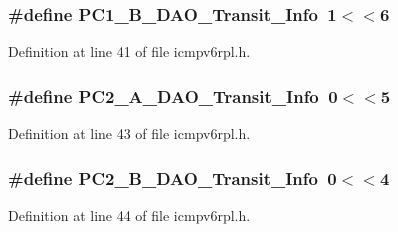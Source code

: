 \subsubsection[{\texorpdfstring{P\+C1\+\_\+\+B\+\_\+\+D\+A\+O\+\_\+\+Transit\+\_\+\+Info}{PC1_B_DAO_Transit_Info}}]{\setlength{\rightskip}{0pt plus 5cm}\#define P\+C1\+\_\+\+B\+\_\+\+D\+A\+O\+\_\+\+Transit\+\_\+\+Info~1$<$$<$6}\hypertarget{group___i_c_m_pv6_r_p_l_ga60733cb2ce82a72353db3118127783f5}{}\label{group___i_c_m_pv6_r_p_l_ga60733cb2ce82a72353db3118127783f5}


Definition at line 41 of file icmpv6rpl.\+h.

\subsubsection[{\texorpdfstring{P\+C2\+\_\+\+A\+\_\+\+D\+A\+O\+\_\+\+Transit\+\_\+\+Info}{PC2_A_DAO_Transit_Info}}]{\setlength{\rightskip}{0pt plus 5cm}\#define P\+C2\+\_\+\+A\+\_\+\+D\+A\+O\+\_\+\+Transit\+\_\+\+Info~0$<$$<$5}\hypertarget{group___i_c_m_pv6_r_p_l_ga45ff21ca0a0df20b71f49005fbe49414}{}\label{group___i_c_m_pv6_r_p_l_ga45ff21ca0a0df20b71f49005fbe49414}


Definition at line 43 of file icmpv6rpl.\+h.

\subsubsection[{\texorpdfstring{P\+C2\+\_\+\+B\+\_\+\+D\+A\+O\+\_\+\+Transit\+\_\+\+Info}{PC2_B_DAO_Transit_Info}}]{\setlength{\rightskip}{0pt plus 5cm}\#define P\+C2\+\_\+\+B\+\_\+\+D\+A\+O\+\_\+\+Transit\+\_\+\+Info~0$<$$<$4}\hypertarget{group___i_c_m_pv6_r_p_l_ga4e4f4816b56e79b12c5779bbe4c8c55d}{}\label{group___i_c_m_pv6_r_p_l_ga4e4f4816b56e79b12c5779bbe4c8c55d}


Definition at line 44 of file icmpv6rpl.\+h.


